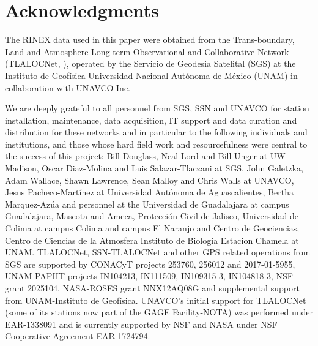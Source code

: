 \documentclass[times,twocolumn,final,authoryear]{elsarticle}
\begin{document}








\section{Acknowledgments}

The RINEX data used in this paper were obtained from the Trans-boundary, Land and Atmosphere Long-term Observational and Collaborative Network (TLALOCNet, \citet{Cabral-Cano:2018}), operated by the Servicio de Geodesia Satelital (SGS) at the Instituto de Geofísica-Universidad Nacional Autónoma de México (UNAM) in collaboration with UNAVCO Inc. 

We are deeply grateful to all personnel from SGS, SSN and UNAVCO for station installation, maintenance, data acquisition, IT support and data curation and distribution for these networks and in particular to the following individuals and institutions, and those whose hard field work and resourcefulness were central to the success of this project: Bill Douglass, Neal Lord and Bill Unger at UW-Madison, Oscar Diaz-Molina and Luis Salazar-Tlaczani at SGS, John Galetzka, Adam Wallace, Shawn Lawrence, Sean Malloy and Chris Walls at UNAVCO, Jesus Pacheco-Martínez at Universidad Autónoma de Aguascalientes, Bertha Marquez-Azúa and personnel at the Universidad de Guadalajara at campus Guadalajara, Mascota and Ameca, Protección Civil de Jalisco, Universidad de Colima at campus Colima and campus El Naranjo and Centro de Geociencias, Centro de Ciencias de la Atmosfera Instituto de Biología Estacion Chamela at UNAM.
TLALOCNet, SSN-TLALOCNet and other GPS related operations from SGS are supported by CONACyT projects 253760, 256012 and 2017-01-5955, UNAM-PAPIIT projects IN104213, IN111509, IN109315-3, IN104818-3, NSF grant 2025104, NASA-ROSES grant NNX12AQ08G and supplemental support from UNAM-Instituto de Geofísica. UNAVCO's initial support for TLALOCNet (some of its stations now part of the GAGE Facility-NOTA) was performed under EAR-1338091 and is currently supported by NSF and NASA under NSF Cooperative Agreement EAR-1724794.
\end{document}
